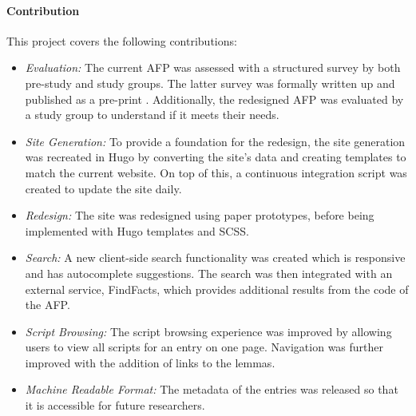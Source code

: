 \documentclass[bsc,frontabs,oneside,singlespacing,parskip,deptreport,logo]{infthesis}
\begin{document}


\paragraph*{Contribution}

This project covers the following contributions:

\begin{itemize}
    \item \emph{Evaluation:} The current AFP was assessed with a structured survey by both pre-study and study groups. The latter survey was formally written up and published as a pre-print \cite{mackenzie2021evaluation}. Additionally, the redesigned AFP was evaluated by a study group to understand if it meets their needs.
    \item \emph{Site Generation:} To provide a foundation for the redesign, the site generation was recreated in Hugo by converting the site's data and creating templates to match the current website. On top of this, a continuous integration script was created to update the site daily.
    \item \emph{Redesign:} The site was redesigned using paper prototypes, before being implemented with Hugo templates and SCSS.
    \item \emph{Search:} A new client-side search functionality was created which is responsive and has autocomplete suggestions. The search was then integrated with an external service, FindFacts, which provides additional results from the code of the AFP.
    \item \emph{Script Browsing:} The script browsing experience was improved by allowing users to view all scripts for an entry on one page. Navigation was further improved with the addition of links to the lemmas.
    \item \emph{Machine Readable Format:} The metadata of the entries was released so that it is accessible for future researchers.
\end{itemize}
\end{document}
